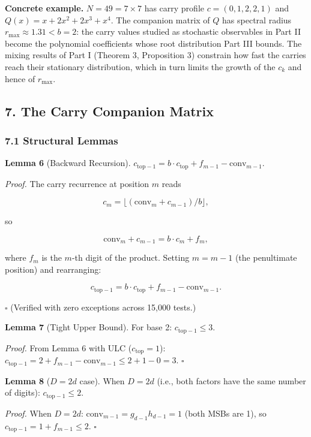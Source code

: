 \documentclass[
  11pt,
]{article}
\begin{document}
\textbf{Concrete example.} \(N = 49 = 7 \times 7\) has carry profile
\(c = (0, 1, 2, 2, 1)\) and \(Q(x) = x + 2x^2 + 2x^3 + x^4\). The companion
matrix of \(Q\) has spectral radius \(r_{\max} \approx 1.31 < b = 2\): the carry
values studied as stochastic observables in Part II become the polynomial
coefficients whose root distribution Part III bounds. The mixing results of Part
I (Theorem 3, Proposition 3) constrain how fast the carries reach their
stationary distribution, which in turn limits the growth of the \(c_k\) and
hence of \(r_{\max}\).

\newpage

\subsection{7. The Carry Companion Matrix}\label{the-carry-companion-matrix}

\subsubsection{7.1 Structural Lemmas}\label{structural-lemmas}

\textbf{Lemma 6} (Backward Recursion).
\(c_{\text{top}-1} = b \cdot c_{\text{top}} + f_{m-1} - \text{conv}_{m-1}\).

\emph{Proof.} The carry recurrence at position \(m\) reads

\[c_m = \lfloor(\mathrm{conv}_m + c_{m-1})/b\rfloor,\]

so

\[\mathrm{conv}_m + c_{m-1} = b \cdot c_m + f_m,\]

where \(f_m\) is the \(m\)-th digit of the product. Setting \(m = m{-}1\) (the
penultimate position) and rearranging:

\[c_{\text{top}-1} = b \cdot c_{\text{top}} + f_{m-1} - \mathrm{conv}_{m-1}.\]

\(\square\) (Verified with zero exceptions across 15,000 tests.)

\textbf{Lemma 7} (Tight Upper Bound). For base 2: \(c_{\text{top}-1} \leq 3\).

\emph{Proof.} From Lemma 6 with ULC (\(c_{\text{top}} = 1\)):
\(c_{\text{top}-1} = 2 + f_{m-1} - \text{conv}_{m-1} \leq 2 + 1 - 0 = 3\).
\(\square\)

\textbf{Lemma 8} (\(D = 2d\) case). When \(D = 2d\) (i.e., both factors have the
same number of digits): \(c_{\text{top}-1} \leq 2\).

\emph{Proof.} When \(D = 2d\): \(\text{conv}_{m-1} = g_{d-1}h_{d-1} = 1\) (both
MSBs are 1), so \(c_{\text{top}-1} = 1 + f_{m-1} \leq 2\). \(\square\)
\end{document}
